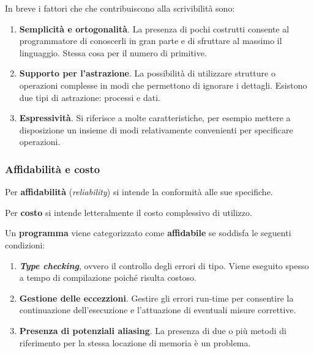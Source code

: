 \documentclass[a4paper]{article}
\begin{document}
	\noindent
	In breve i fattori che che contribuiscono alla scrivibilità sono:
	\begin{enumerate}
		\item \textbf{Semplicità e ortogonalità}. La presenza di pochi costrutti consente al programmatore di conoscerli in gran parte e di sfruttare al massimo il linguaggio. Stessa cosa per il numero di primitive.
		
		\item \textbf{Supporto per l'astrazione}. La possibilità di utilizzare strutture o operazioni complesse in modi che permettono di ignorare i dettagli. Esistono due tipi di astrazione: processi e dati.
		
		\item \textbf{Espressività}. Si riferisce a molte caratteristiche, per esempio mettere a disposizione un insieme di modi relativamente convenienti per specificare operazioni.
	\end{enumerate}\newpage
	
	\subsubsection{Affidabilità e costo}
	
	\begin{boxdef}
		Per \textcolor{Red3}{\textbf{affidabilità}} (\emph{reliability}) si intende la conformità alle sue specifiche.
	\end{boxdef}
	\begin{boxdef}
		Per \textcolor{Red3}{\textbf{costo}} si intende letteralmente il costo complessivo di utilizzo.
	\end{boxdef}
	
	\noindent
	Un \textbf{programma} viene categorizzato come \textbf{affidabile} se soddisfa le seguenti condizioni:
	\begin{enumerate}
		\item \textbf{\emph{Type checking}}, ovvero il controllo degli errori di tipo. Viene eseguito spesso a tempo di compilazione poiché risulta costoso.
		
		\item \textbf{Gestione delle eccezzioni}. Gestire gli errori run-time per consentire la continuazione dell'esecuzione e l'attuazione di eventuali misure correttive.
		
		\item \textbf{Presenza di potenziali aliasing}. La presenza di due o più metodi di riferimento per la stessa locazione di memoria è un problema.
	\end{enumerate}
\end{document}
